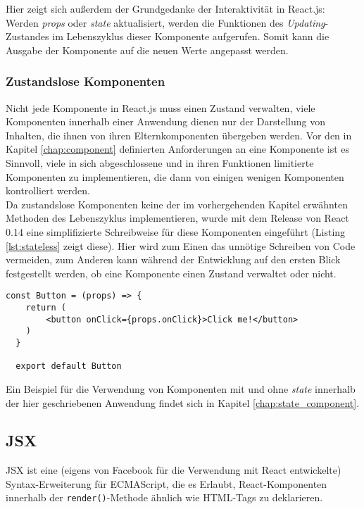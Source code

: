 Hier zeigt sich außerdem der Grundgedanke der Interaktivität in React.js: Werden \textit{props} oder \textit{state} aktualisiert, werden die Funktionen des \textit{Updating}-Zustandes im Lebenszyklus dieser Komponente aufgerufen. Somit kann die Ausgabe der Komponente auf die neuen Werte angepasst werden.

\subsubsection{Zustandslose Komponenten}
\label{chap:stateless}
Nicht jede Komponente in React.js muss einen Zustand verwalten, viele Komponenten innerhalb einer Anwendung dienen nur der Darstellung von Inhalten, die ihnen von ihren Elternkomponenten übergeben werden. Vor den in Kapitel \ref{chap:component} definierten Anforderungen an eine Komponente ist es Sinnvoll, viele in sich abgeschlossene und in ihren Funktionen limitierte Komponenten zu implementieren, die dann von einigen wenigen Komponenten kontrolliert werden.\\
Da zustandslose Komponenten keine der im vorhergehenden Kapitel erwähnten Methoden des Lebenszyklus implementieren, wurde mit dem Release von React 0.14\footnotemark{} eine simplifizierte Schreibweise für diese Komponenten eingeführt (Listing \ref{lst:stateless} zeigt diese). Hier wird zum Einen das unnötige Schreiben von Code vermeiden, zum Anderen kann während der Entwicklung auf den ersten Blick festgestellt werden, ob eine Komponente einen Zustand verwaltet oder nicht.


\begin{lstlisting}[caption={Simplifizierte Schreibweise für Komponenten ohne \textit{state}}, label=lst:stateless]
  const Button = (props) => {
  	return (
  		<button onClick={props.onClick}>Click me!</button>
  	)
  }

  export default Button
\end{lstlisting}

Ein Beispiel für die Verwendung von Komponenten mit und ohne \textit{state} innerhalb der hier geschriebenen Anwendung findet sich in Kapitel \ref{chap:state_component}.

\subsection{JSX}
JSX ist eine (eigens von Facebook für die Verwendung mit React entwickelte) Syntax-Erweiterung für ECMAScript, die es Erlaubt, React-Komponenten innerhalb der \verb|render()|-Methode ähnlich wie HTML-Tags zu deklarieren.

